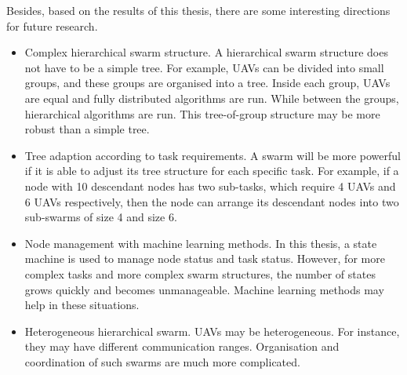 Besides, based on the results of this thesis,
there are some interesting directions for future research.
\begin{itemize}
    \item Complex hierarchical swarm structure.
          A hierarchical swarm structure does not have to be a simple tree.
          For example, UAVs can be divided into small groups,
          and these groups are organised into a tree.
          Inside each group, UAVs are equal and fully distributed algorithms are run.
          While between the groups, hierarchical algorithms are run.
          This tree-of-group structure may be more robust than a simple tree.
    \item Tree adaption according to task requirements.
          A swarm will be more powerful
          if it is able to adjust its tree structure for each specific task.
          For example, if a node with 10 descendant nodes has two sub-tasks,
          which require 4 UAVs and 6 UAVs respectively,
          then the node can arrange its descendant nodes into two sub-swarms of size 4 and size 6.
    \item Node management with machine learning methods.
          In this thesis, a state machine is used to manage node status and task status.
          However, for more complex tasks and more complex swarm structures,
          the number of states grows quickly and becomes unmanageable.
          Machine learning methods may help in these situations.
    \item Heterogeneous hierarchical swarm.
          UAVs may be heterogeneous.
          For instance, they may have different communication ranges.
          Organisation and coordination of such swarms are much more complicated.
\end{itemize}